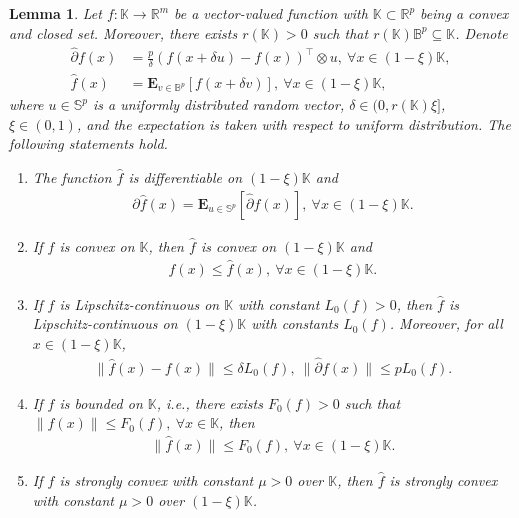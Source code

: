 \documentclass[12pt,draftcls,onecolumn]{IEEEtran}%
\newtheorem{lemma}{Lemma}
\begin{document}
\begin{lemma}\label{dbco:lemma:uniformsmoothing}
Let $f:\mathbb{K}\rightarrow\mathbb{R}^m$ be a vector-valued function with $\mathbb{K}\subset\mathbb{R}^p$ being a convex and closed set. Moreover, there exists  $r(\mathbb{K})>0$ such that $r(\mathbb{K})\mathbb{B}^p\subseteq\mathbb{K}$. Denote
\begin{align*}
\hat{\partial} f(x)&=\frac{p}{\delta}(f(x+\delta u)-f(x))^\top\otimes u,~\forall x\in(1-\xi)\mathbb{K},\\
\hat{f}(x)&=\mathbf{E}_{v\in\mathbb{B}^p}[f(x+\delta v)],~\forall x\in(1-\xi)\mathbb{K},
\end{align*}
where $u\in\mathbb{S}^p$ is a uniformly distributed random vector, $\delta\in(0,r(\mathbb{K})\xi]$, $\xi\in(0,1)$, and the expectation is taken with respect to uniform distribution. The following statements hold.
\begin{enumerate}[label=(\alph*)]
\item The function $\hat{f}$ is differentiable on $(1-\xi)\mathbb{K}$ and
\begin{align*}
\partial \hat{f}(x)
=\mathbf{E}_{u\in\mathbb{S}^p}[\hat{\partial}f(x)],~\forall x\in(1-\xi)\mathbb{K}.
\end{align*}

\item If $f$ is convex on $\mathbb{K}$, then $\hat{f}$ is convex on $(1-\xi)\mathbb{K}$ and
\begin{align*}
f(x)\le \hat{f}(x),~\forall x\in(1-\xi)\mathbb{K}.
\end{align*}

\item If $f$ is Lipschitz-continuous on $\mathbb{K}$ with constant $L_0(f)>0$, then $\hat{f}$ is Lipschitz-continuous on $(1-\xi)\mathbb{K}$ with constants $L_0(f)$. Moreover, for all $x\in(1-\xi)\mathbb{K}$,
\begin{align*}
\|\hat{f}(x)-f(x)\|\le\delta L_0(f),~\|\hat{\partial}f(x)\|\le pL_0(f).
\end{align*}

\item If $f$ is bounded on $\mathbb{K}$, i.e., there exists $F_0(f)>0$ such that $\|f(x)\|\le F_0(f),~\forall x\in\mathbb{K}$, then
\begin{align*}
\|\hat{f}(x)\|\le F_0(f),~\forall x\in(1-\xi)\mathbb{K}.
\end{align*}

\item If $f$ is strongly convex with constant $\mu>0$ over $\mathbb{K}$, then $\hat{f}$ is strongly convex with constant $\mu>0$ over $(1-\xi)\mathbb{K}$.
\end{enumerate}
\end{lemma}
\end{document}

